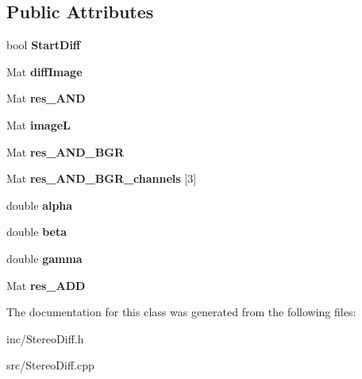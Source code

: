\subsection*{Public Attributes}
\begin{DoxyCompactItemize}
\item 
bool {\bfseries Start\+Diff}\hypertarget{class_stereo_diff_acee17a3791ca92ad8b65cc12d6b08177}{}\label{class_stereo_diff_acee17a3791ca92ad8b65cc12d6b08177}

\item 
Mat {\bfseries diff\+Image}\hypertarget{class_stereo_diff_a652b54fb8337300919097a8b44097034}{}\label{class_stereo_diff_a652b54fb8337300919097a8b44097034}

\item 
Mat {\bfseries res\+\_\+\+A\+ND}\hypertarget{class_stereo_diff_a595f25af352ef8fa77ea110dd3ab1b43}{}\label{class_stereo_diff_a595f25af352ef8fa77ea110dd3ab1b43}

\item 
Mat {\bfseries imageL}\hypertarget{class_stereo_diff_a0ff31e2271dc9f2a2c97577798b0b5aa}{}\label{class_stereo_diff_a0ff31e2271dc9f2a2c97577798b0b5aa}

\item 
Mat {\bfseries res\+\_\+\+A\+N\+D\+\_\+\+B\+GR}\hypertarget{class_stereo_diff_a870bc6fcf520458156093088e60d4ce3}{}\label{class_stereo_diff_a870bc6fcf520458156093088e60d4ce3}

\item 
Mat {\bfseries res\+\_\+\+A\+N\+D\+\_\+\+B\+G\+R\+\_\+channels} \mbox{[}3\mbox{]}\hypertarget{class_stereo_diff_a314bc381fd8e199747171714788ce3a8}{}\label{class_stereo_diff_a314bc381fd8e199747171714788ce3a8}

\item 
double {\bfseries alpha}\hypertarget{class_stereo_diff_a6bccf2369ffd1af72befc554fd7a558b}{}\label{class_stereo_diff_a6bccf2369ffd1af72befc554fd7a558b}

\item 
double {\bfseries beta}\hypertarget{class_stereo_diff_a45ffabf29c2809c3501e5b38ecf76062}{}\label{class_stereo_diff_a45ffabf29c2809c3501e5b38ecf76062}

\item 
double {\bfseries gamma}\hypertarget{class_stereo_diff_ad393dc3100627a3c6700d1231032d96a}{}\label{class_stereo_diff_ad393dc3100627a3c6700d1231032d96a}

\item 
Mat {\bfseries res\+\_\+\+A\+DD}\hypertarget{class_stereo_diff_a25c46209ed4657d9d71767e67a2a27d3}{}\label{class_stereo_diff_a25c46209ed4657d9d71767e67a2a27d3}

\end{DoxyCompactItemize}


The documentation for this class was generated from the following files\+:\begin{DoxyCompactItemize}
\item 
inc/Stereo\+Diff.\+h\item 
src/Stereo\+Diff.\+cpp\end{DoxyCompactItemize}
